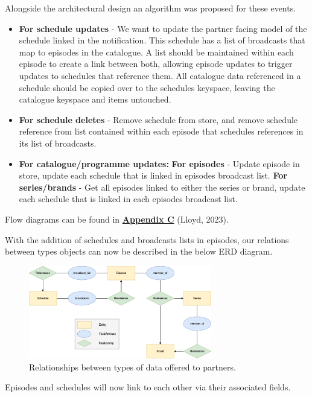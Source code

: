     Alongside the architectural design an algorithm was proposed for these events.
    \begin{itemize}
      \item \textbf{For schedule updates} - We want to update the partner facing model of the schedule linked in the notification. This schedule has a 
      list of broadcasts that map to episodes in the catalogue. A list should be maintained within each episode to create a link between both, allowing episode 
      updates to trigger updates to schedules that reference them. All catalogue data referenced in a schedule should be copied over to the schedules keyspace,
      leaving the catalogue keyspace and items untouched.
      \item \textbf{For schedule deletes} - Remove schedule from store, and remove schedule reference from list contained within each episode that schedules 
      references in its list of broadcasts.
      \item \textbf{For catalogue/programme updates:}
        \subitem \textbf{For episodes} - Update episode in store, update each schedule that is linked in episodes broadcast list.
        \subitem \textbf{For series/brands} - Get all episodes linked to either the series or brand, update each schedule that is linked in each episodes 
        broadcast list.
    \end{itemize}

    Flow diagrams can be found in \hyperref[sec:AppendixC]{\textbf{Appendix C}} (Lloyd, 2023).

    With the addition of schedules and broadcasts lists in episodes, our relations between types objects can now be described in the below ERD diagram.

    \begin{figure}[H]
      \centering
      \includegraphics[width=8cm]{assets/dataERD.drawio.png}
      \caption{Relationships between types of data offered to partners.}
      \label{fig:relationshipsERD}
    \end{figure}

    Episodes and schedules will now link to each other via their associated fields.


\newpage
